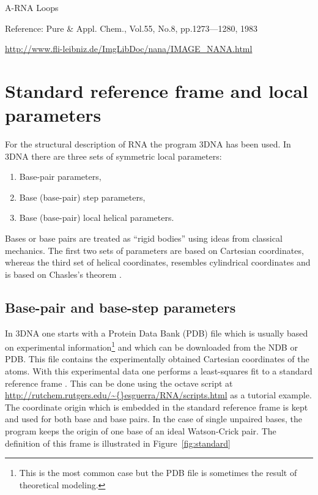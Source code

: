 A-RNA 
Loops

Reference:
Pure \& Appl. Chem., Vol.55, No.8, pp.1273—1280, 1983

\url{http://www.fli-leibniz.de/ImgLibDoc/nana/IMAGE_NANA.html}


\section{Standard reference frame and local parameters}
For  the  structural  description  of RNA  the  program  \textsf{3DNA}
\cite{lu2003} has been used.  In \textsf{3DNA} there are three sets of
symmetric local parameters:
\begin{enumerate}
\item Base-pair parameters,
\item Base (base-pair) step parameters,
\item Base (base-pair) local helical parameters.
\end{enumerate}
Bases or base  pairs are treated as ``rigid  bodies'' using ideas from
classical mechanics.
The first two  sets of parameters are based  on Cartesian coordinates,
whereas the  third set  of helical coordinates,  resembles cylindrical
coordinates and is based on Chasles's theorem \cite{babcock1994}.

\subsection{Base-pair and base-step parameters}
In  \textsf{3DNA}   one  starts  with   a  Protein  Data   Bank  (PDB)
\cite{berman2000}  file   which  is  usually   based  on  experimental
information\footnote{This is the most common  case but the PDB file is
  sometimes  the result of  theoretical modeling.}   and which  can be
downloaded from the NDB or  PDB. This file contains the experimentally
obtained Cartesian  coordinates of  the atoms. With  this experimental
data one  performs a least-squares  fit to a standard  reference frame
\cite{olson2001}. This can be done using the \textsf{octave} script at
\url{http://rutchem.rutgers.edu/\~{}esguerra/RNA/scripts.html}   as  a
tutorial  example.  The  coordinate origin  which is  embedded  in the
standard  reference frame  is kept  and used  for both  base  and base
pairs.  In  the case of single  unpaired bases, the  program keeps the
origin of one  base of an ideal Watson-Crick  pair.  The definition of
this frame is illustrated in Figure~\ref{fig:standard}

